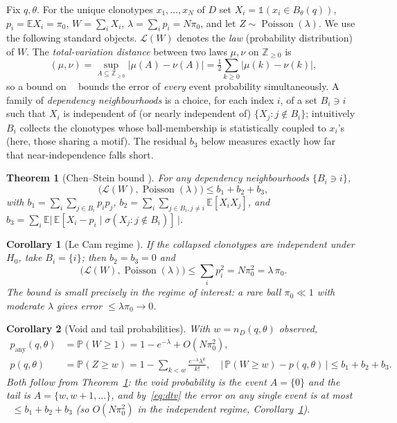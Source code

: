 \documentclass[11pt]{article}
\theoremstyle{oldplain}
\newtheorem{theorem}{Theorem}
\newtheorem{corollary}{Corollary}
\theoremstyle{oldrem}
\DeclareMathOperator{\Poisson}{Poisson}
\DeclareMathOperator{\dTV}{d_{\mathrm{TV}}}
\newcommand{\ball}[2]{B_{#1}(#2)}
\newcommand{\E}{\mathbb{E}}
\newcommand{\Prob}{\mathbb{P}}
\newcommand{\one}{\mathds{1}}
\begin{document}
Fix $q,\theta$. For the unique clonotypes $x_1,\dots,x_N$ of $D$ set
$X_i=\one(x_i\in\ball{\theta}{q})$, $p_i=\E X_i=\pi_0$, $W=\sum_i X_i$, $\lambda=\sum_i p_i = N\pi_0$,
and let $Z\sim\Poisson(\lambda)$. We use the following standard objects. $\mathcal{L}(W)$ denotes the
\emph{law} (probability distribution) of $W$. The \emph{total-variation distance} between two laws
$\mu,\nu$ on $\mathbb{Z}_{\ge 0}$ is
\begin{equation}\label{eq:dtv}
  \dTV(\mu,\nu) = \sup_{A\subseteq\mathbb{Z}_{\ge0}} |\mu(A)-\nu(A)| = \tfrac12\sum_{k\ge0}|\mu(k)-\nu(k)|,
\end{equation}
so a bound on $\dTV$ bounds the error of \emph{every} event probability simultaneously. A family of
\emph{dependency neighbourhoods} is a choice, for each index $i$, of a set $B_i\ni i$ such that $X_i$
is independent of (or nearly independent of) $\{X_j : j\notin B_i\}$; intuitively $B_i$ collects the
clonotypes whose ball-membership is statistically coupled to $x_i$'s (here, those sharing a motif).
The residual $b_3$ below measures exactly how far that near-independence falls short.

\begin{theorem}[Chen--Stein bound \cite{Arratia1989,Arratia1990}]\label{thm:cs}
For any dependency neighbourhoods $\{B_i \ni i\}$,
\begin{equation}\label{eq:cs}
  \dTV\!\big(\mathcal{L}(W),\Poisson(\lambda)\big) \le b_1+b_2+b_3,
\end{equation}
with $b_1=\sum_i\sum_{j\in B_i}p_ip_j$, $b_2=\sum_i\sum_{j\in B_i, j\ne i}\E[X_iX_j]$, and
$b_3=\sum_i \E\big|\,\E[X_i-p_i\mid \sigma(X_j: j\notin B_i)]\,\big|$.
\end{theorem}

\begin{corollary}[Le Cam regime \cite{LeCam1960}]\label{cor:lecam}
If the collapsed clonotypes are independent under $H_0$, take $B_i=\{i\}$; then $b_2=b_3=0$ and
\begin{equation}\label{eq:lecam}
  \dTV\!\big(\mathcal{L}(W),\Poisson(\lambda)\big) \le \sum_i p_i^2 = N\pi_0^2 = \lambda\,\pi_0 .
\end{equation}
The bound is small precisely in the regime of interest: a rare ball $\pi_0\ll 1$ with moderate
$\lambda$ gives error $\le \lambda\pi_0 \to 0$.
\end{corollary}

\begin{corollary}[Void and tail probabilities]\label{cor:void}
With $w=n_D(q,\theta)$ observed,
\begin{align}
  p_{\mathrm{any}}(q,\theta) &= \Prob(W\ge 1) = 1-e^{-\lambda} + O(N\pi_0^2), \label{eq:pany}\\
  p(q,\theta) &= \Prob(Z \ge w) = 1 - \sum_{k<w} \frac{e^{-\lambda}\lambda^k}{k!},
  \quad |\,\Prob(W\ge w) - p(q,\theta)\,| \le b_1+b_2+b_3. \label{eq:ptail}
\end{align}
Both follow from Theorem~\ref{thm:cs}: the void probability is the event $A=\{0\}$ and the tail is
$A=\{w,w+1,\dots\}$, and by~\eqref{eq:dtv} the error on any single event is at most $\dTV\le
b_1+b_2+b_3$ (so $O(N\pi_0^2)$ in the independent regime, Corollary~\ref{cor:lecam}).
\end{corollary}
\end{document}
